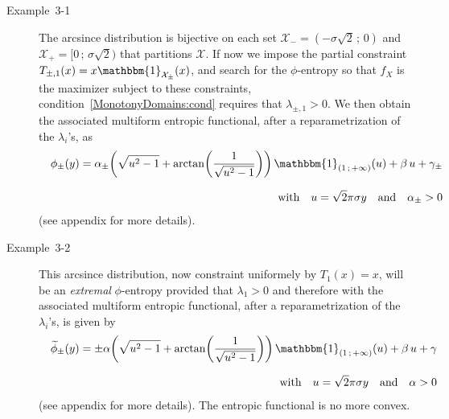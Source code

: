 \documentclass[entropy,article,submit,moreauthors,pdftex]{Definitions/mdpi}
\newcommand{\SZ}[1]{{\color{blue} #1}}
\def\X{\mathcal{X}}
\def\un{\mathbbm{1}}
\begin{document}
\begin{description}
\item[Example~3-1] The arcsince distribution
  is  bijective on each set $\X_-  = ( - \sigma \sqrt2  \, ; \,
  0)$ and $\X_+ =  [0 \, ; \, \sigma \sqrt2)$ that  partitions $\X$.  \SZ{If now
      we impose the  partial constraint $T_{\pm,1}(x) =  x \un_{\X_\pm}(x)$, and
      search for  the $\phi$-entropy so that  $f_X$ is the maximizer  subject to
      these  constraints,   condition~\ref{MonotonyDomains:cond}  requires  that
      $\lambda_{\pm,1} > 0$.  We then  obtain the} associated multiform entropic
    functional,    after    a    reparametrization   of    the    $\lambda_i$'s,
    \SZ{as
      \begin{eqnarray*}
        &&\phi_\pm(y) = \alpha_\pm \left( \sqrt{u^2 - 1} +
    \arctan\left( \frac{1}{\sqrt{u^2 - 1}}  \right) \right) \,
    \un_{( 1  \, ;  \, +\infty  )}(u) +  \beta \,  u +
    \gamma_\pm\\[2.5mm]
    &&\mbox{with} \quad u = \sqrt2 \pi \sigma y \quad \mbox{and}  \quad \alpha_\pm > 0
    \end{eqnarray*}
    } (see  appendix for more
    details).
%
\item[Example~3-2]  This arcsince  distribution,  now  constraint uniformely  by
  $T_1(x)  = x$,  \SZ{will be  an {\em  extremal} $\phi$-entropy  provided} that
  $\lambda_1  > 0$  and \SZ{therefore  with} the  associated multiform  entropic
  functional,  after   a  reparametrization  of  the   $\lambda_i$'s,  is  given
  by
  \SZ{
   \begin{eqnarray*}
   &&\widetilde{\phi}_\pm(y) = \pm \alpha  \left( \sqrt{u^2 -
    1} + \arctan\left( \frac{1}{\sqrt{u^2 - 1}} \right) \right)
  \, \un_{(  1 \, ;  \, +\infty )}(u)  + \beta \,  u +
  \gamma\\[2.5mm]
  && \mbox{with} \quad u = \sqrt2 \pi \sigma y \quad  \mbox{and} \quad \alpha  > 0
  \end{eqnarray*}
    }
  (see appendix for  more details).
  The entropic functional is no more convex.
%
\end{description}
\end{document}
